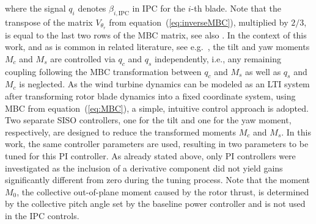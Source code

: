 where the signal $q_i$ denotes $\beta_{i,\text{IPC}}$ in IPC for the $i$-th blade. %
Note that the transpose of the matrix $V_{\theta_{r}}$ from equation~(\ref{eq:inverseMBC}), multiplied by $2/3$, is equal to the last two rows of the MBC matrix, see also \cite{ossmann2017load}. In the context of this work, and as is common in related literature, see e.g.~\cite{he2018combined}, the tilt and yaw moments $M_c$ and $M_s$ are controlled via $q_c$ and $q_s$ independently, i.e., any remaining coupling following the MBC transformation between $q_c$ and $M_s$ as well as $q_s$ and $M_c$ is neglected. As the wind turbine dynamics can be modeled as an LTI system after transforming rotor blade dynamics into a fixed coordinate system, using MBC from equation~(\ref{eq:MBC}), a simple, intuitive control approach is adopted. Two separate SISO controllers, one for the tilt and one for the yaw moment, respectively, are designed to reduce the transformed moments $M_c$ and $M_s$. In this work, the same controller parameters are used, resulting in two parameters to be tuned for this PI controller. As already stated above, only PI controllers were investigated as the inclusion of a derivative component did not yield gains significantly different from zero during the tuning process. Note that the moment $M_0$, the collective out-of-plane moment caused by the rotor thrust, is determined by the collective pitch angle set by the baseline power controller and is not used in the IPC controls.

